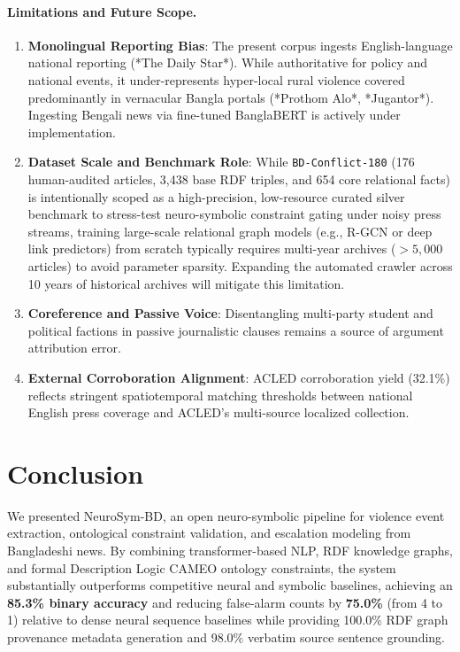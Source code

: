 \documentclass[11pt,a4paper]{article}
\begin{document}
\paragraph{Limitations and Future Scope.}
\begin{enumerate}
  \item \textbf{Monolingual Reporting Bias}: The present corpus ingests English-language national reporting (*The Daily Star*). While authoritative for policy and national events, it under-represents hyper-local rural violence covered predominantly in vernacular Bangla portals (*Prothom Alo*, *Jugantor*). Ingesting Bengali news via fine-tuned BanglaBERT is actively under implementation.
  \item \textbf{Dataset Scale and Benchmark Role}: While \texttt{BD-Conflict-180} (176 human-audited articles, 3,438 base RDF triples, and 654 core relational facts) is intentionally scoped as a high-precision, low-resource curated silver benchmark to stress-test neuro-symbolic constraint gating under noisy press streams, training large-scale relational graph models (e.g., R-GCN or deep link predictors) from scratch typically requires multi-year archives ($>5,000$ articles) to avoid parameter sparsity. Expanding the automated crawler across 10 years of historical archives will mitigate this limitation.
  \item \textbf{Coreference and Passive Voice}: Disentangling multi-party student and political factions in passive journalistic clauses remains a source of argument attribution error.
  \item \textbf{External Corroboration Alignment}: ACLED corroboration yield (32.1\%) reflects stringent spatiotemporal matching thresholds between national English press coverage and ACLED's multi-source localized collection.
\end{enumerate}

\section{Conclusion}
\label{sec:conclusion}

We presented NeuroSym-BD, an open neuro-symbolic pipeline for
violence event extraction, ontological constraint validation, and escalation modeling from Bangladeshi news.
By combining transformer-based NLP, RDF knowledge graphs, and formal Description Logic CAMEO ontology constraints,
the system substantially outperforms competitive neural and symbolic baselines, achieving an \textbf{85.3\% binary accuracy}
and reducing false-alarm counts by \textbf{75.0\%} (from 4 to 1) relative to dense neural sequence baselines while providing 100.0\% RDF graph provenance metadata generation and 98.0\% verbatim source sentence grounding.
\end{document}
